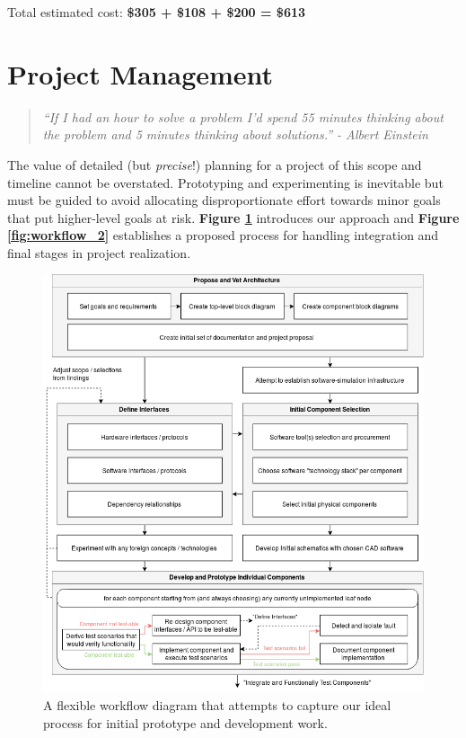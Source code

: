 \documentclass{article}
\begin{document}
\vspace{0.25cm}

\noindent
{\Large%
Total estimated cost: \textbf{\$305 + \$108 + \$200 = \$613}
}

\section{Project Management}

\begin{quote}
	\textit{``If I had an hour to solve a problem I'd spend 55 minutes
	thinking about the problem and 5 minutes thinking about
	solutions.'' - Albert Einstein}
\end{quote}

\noindent The value of detailed (but \textit{precise}!) planning for a project
of this scope and timeline cannot be overstated. Prototyping and experimenting
is inevitable but must be guided to avoid allocating disproportionate effort
towards minor goals that put higher-level goals at risk.
\textbf{Figure \ref{fig:workflow_1}} introduces our approach and
\textbf{Figure \ref{fig:workflow_2}} establishes a proposed process for
handling integration and final stages in project realization.

\begin{figure}[H]
	\centering
	\includegraphics[width=\linewidth]{../src/im/workflow_1}
	\caption{A flexible workflow diagram that attempts to capture our ideal
		process for initial prototype and development work.}
	\label{fig:workflow_1}
\end{figure}
\end{document}
